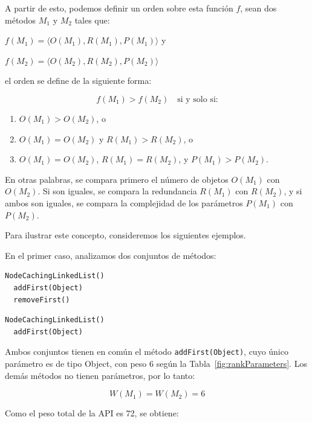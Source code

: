 A partir de esto, podemos definir un orden sobre esta función $f$, sean dos
métodos $M_1$ y $M_2$ tales que: 

\( f(M_1) = \langle O(M_1), R(M_1), P(M_1) \rangle \) y

\( f(M_2) = \langle O(M_2), R(M_2), P(M_2) \rangle \) 
\vspace{5pt} 

el orden se define de la siguiente forma:

\[
f(M_1) > f(M_2) \quad \text{si y solo si:}
\]

\begin{enumerate}
    \item \( O(M_1) > O(M_2) \), o
    \item \( O(M_1) = O(M_2) \) y \( R(M_1) > R(M_2) \), o
    \item \( O(M_1) = O(M_2) \), \( R(M_1) = R(M_2) \), y \( P(M_1) > P(M_2) \).
\end{enumerate}

En otras palabras, se compara primero el número de objetos \( O(M_1) \) con \( O(M_2) \). 
Si son iguales, se compara la redundancia \( R(M_1) \) con \( R(M_2) \), y si ambos son iguales, 
se compara la complejidad de los parámetros \( P(M_1) \) con \( P(M_2) \).

Para ilustrar este concepto, consideremos los siguientes ejemplos.


En el primer caso, analizamos dos conjuntos de métodos:

\vspace{5pt}

\begin{lstlisting}[numbers=none, caption=Conjunto de métodos \( M_1 \)]
  NodeCachingLinkedList()
  addFirst(Object)
  removeFirst()
\end{lstlisting}

\begin{lstlisting}[numbers=none, caption=Conjunto de métodos \( M_2 \)]
  NodeCachingLinkedList()
  addFirst(Object)
\end{lstlisting}




Ambos conjuntos tienen en común el método \texttt{addFirst(Object)}, cuyo único parámetro es de tipo Object, 
con peso 6 según la Tabla~\ref{fig:rankParameters}. 
Los demás métodos no tienen parámetros, por lo tanto:

\[
W(M_1) = W(M_2) = 6
\]

Como el peso total de la API es 72, se obtiene:


